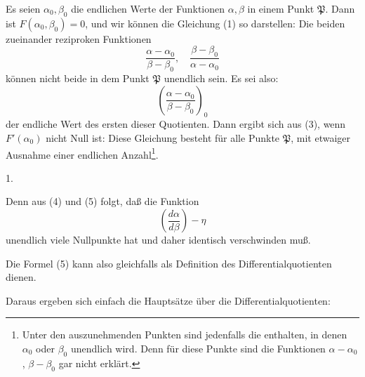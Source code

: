 
Es seien $\alpha_0, \beta_0$ die endlichen Werte der Funktionen $\alpha, \beta$ in einem Punkt $\mathfrak{P}$. Dann ist $F(\alpha_0, \beta_0) = 0$, und wir können die Gleichung (1) so darstellen:
Die beiden zueinander reziproken Funktionen
\[
\frac{\alpha - \alpha_0}{\beta - \beta_0}, \quad \frac{\beta - \beta_0}{\alpha - \alpha_0}
\]
können nicht beide in dem Punkt $\mathfrak{P}$ unendlich sein. Es sei also:
\[
\left(\frac{\alpha - \alpha_0}{\beta - \beta_0}\right)_0
\]
der endliche Wert des ersten dieser Quotienten. Dann ergibt sich aus (3), wenn $F'(\alpha_0)$ nicht Null ist:
Diese Gleichung besteht für alle Punkte $\mathfrak{P}$, mit etwaiger Ausnahme einer endlichen Anzahl\footnote{Unter den auszunehmenden Punkten sind jedenfalls die enthalten, in denen $\alpha_0$ oder $\beta_0$ unendlich wird. Denn für diese Punkte sind die Funktionen $\alpha - \alpha_0$, $\beta - \beta_0$ gar nicht erklärt.}.

1. 

Denn aus (4) und (5) folgt, daß die Funktion
\[
\left(\frac{d\alpha}{d\beta}\right) - \eta
\]
unendlich viele Nullpunkte hat und daher identisch verschwinden muß.

Die Formel (5) kann also gleichfalls als Definition des Differentialquotienten dienen.

Daraus ergeben sich einfach die Hauptsätze über die Differentialquotienten:
